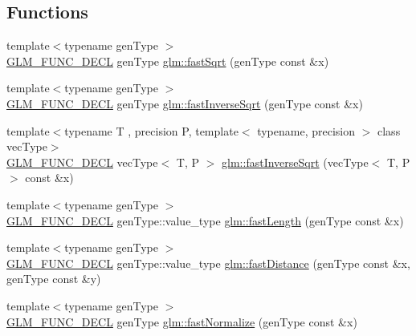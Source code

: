 \subsection*{Functions}
\begin{DoxyCompactItemize}
\item 
{\footnotesize template$<$typename gen\+Type $>$ }\\\hyperlink{setup_8hpp_ab2d052de21a70539923e9bcbf6e83a51}{G\+L\+M\+\_\+\+F\+U\+N\+C\+\_\+\+D\+E\+CL} gen\+Type \hyperlink{group__gtx__fast__square__root_gab07ddede2731f3438d687a652c843673}{glm\+::fast\+Sqrt} (gen\+Type const \&x)
\item 
{\footnotesize template$<$typename gen\+Type $>$ }\\\hyperlink{setup_8hpp_ab2d052de21a70539923e9bcbf6e83a51}{G\+L\+M\+\_\+\+F\+U\+N\+C\+\_\+\+D\+E\+CL} gen\+Type \hyperlink{group__gtx__fast__square__root_ga65237d716748c6262f316ec1eaf7f073}{glm\+::fast\+Inverse\+Sqrt} (gen\+Type const \&x)
\item 
{\footnotesize template$<$typename T , precision P, template$<$ typename, precision $>$ class vec\+Type$>$ }\\\hyperlink{setup_8hpp_ab2d052de21a70539923e9bcbf6e83a51}{G\+L\+M\+\_\+\+F\+U\+N\+C\+\_\+\+D\+E\+CL} vec\+Type$<$ T, P $>$ \hyperlink{group__gtx__fast__square__root_ga903878071f92e51e551791e584a171a1}{glm\+::fast\+Inverse\+Sqrt} (vec\+Type$<$ T, P $>$ const \&x)
\item 
{\footnotesize template$<$typename gen\+Type $>$ }\\\hyperlink{setup_8hpp_ab2d052de21a70539923e9bcbf6e83a51}{G\+L\+M\+\_\+\+F\+U\+N\+C\+\_\+\+D\+E\+CL} gen\+Type\+::value\+\_\+type \hyperlink{group__gtx__fast__square__root_ga70aa3c80d8bb22e021c6c3ebdcf8e3ee}{glm\+::fast\+Length} (gen\+Type const \&x)
\item 
{\footnotesize template$<$typename gen\+Type $>$ }\\\hyperlink{setup_8hpp_ab2d052de21a70539923e9bcbf6e83a51}{G\+L\+M\+\_\+\+F\+U\+N\+C\+\_\+\+D\+E\+CL} gen\+Type\+::value\+\_\+type \hyperlink{group__gtx__fast__square__root_ga69778792fcadc29f586efa3ec2118cdc}{glm\+::fast\+Distance} (gen\+Type const \&x, gen\+Type const \&y)
\item 
{\footnotesize template$<$typename gen\+Type $>$ }\\\hyperlink{setup_8hpp_ab2d052de21a70539923e9bcbf6e83a51}{G\+L\+M\+\_\+\+F\+U\+N\+C\+\_\+\+D\+E\+CL} gen\+Type \hyperlink{group__gtx__fast__square__root_ga3b02c1d6e0c754144e2f1e110bf9f16c}{glm\+::fast\+Normalize} (gen\+Type const \&x)
\end{DoxyCompactItemize}


